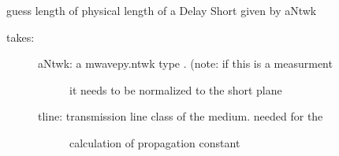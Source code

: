 \documentclass[letterpaper,10pt,english]{sphinxmanual}
\begin{document}

\begin{fulllineitems}
\label{api/mwavepy.calibration:mwavepy.calibration.calibrationAlgorithms.guess_length_of_delay_short}
guess length of physical length of a Delay Short given by aNtwk
\begin{description}
\item[{takes:}] \leavevmode\begin{description}
\item[{aNtwk: a mwavepy.ntwk type . (note: if this is a measurment }] \leavevmode
it needs to be normalized to the short plane

\item[{tline: transmission line class of the medium. needed for the }] \leavevmode
calculation of propagation constant

\end{description}

\end{description}

\end{fulllineitems}

\end{document}
